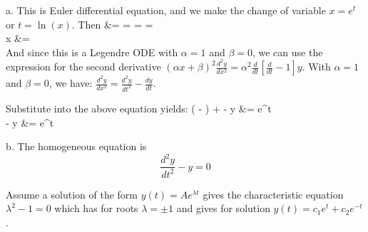 \documentclass[12pt,twoside]{article}
\begin{document}
\be 
\item [a.]
This is Euler differential equation, and we make the change of variable $x=e^t$ or $t=\ln(x)$.
Then
\ba
	 &=   =   =    =     \\ 
	x   &=  \\
\ea
And since this is a Legendre ODE with $\alpha=1$ and $\beta=0$, we can use the expression for the second derivative 
$(\alpha x + \beta)^2 \frac{d^2y}{dx^2} = \alpha^2 \frac{d}{d t} [\frac{d}{dt} - 1] y$.
With $\alpha=1$ and $\beta=0$, we have: $ \frac{d^2y}{dx^2} =  \frac{d^2y}{dt^2} - \frac{dy}{dt}$. \\ \hfill \break

Substitute into the above equation yields:
\ba
	(  - ) +  - y &= e^t \\
	  - y &= e^t \\
\ea

\item [b.]
The homogeneous equation is
\[
	 \frac{d^2y}{dt^2} - y = 0
\]

Assume a solution of the form $y(t) = A e^{\lambda t}$ gives the characteristic equation $\lambda^2 - 1 = 0$ which has for roots $\lambda = \pm1$ and gives
for solution $y(t) = c_1 e^t + c_2 e^{-t}$.
\end{document}
